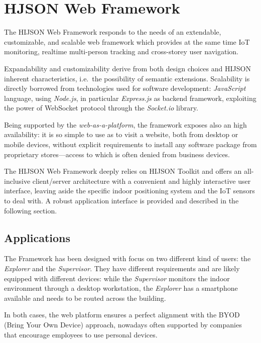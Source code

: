 \section{HJSON Web Framework}\label{hijson-web-framework}

The HIJSON Web Framework responds to the needs of an extendable,
customizable, and scalable web framework which provides at the same time IoT
monitoring, realtime multi-person tracking and cross-storey user
navigation.

Expandability and customizability derive from both design choices and
HIJSON inherent characteristics, i.e.~the possibility of semantic extensions.
Scalability is directly borrowed from technologies used for
software development: \emph{JavaScript} language, using \emph{Node.js},
in particular \emph{Express.js} as backend framework, exploiting the
power of WebSocket protocol through the \emph{Socket.io} library.

Being supported by the \emph{web-as-a-platform}, the framework exposes
also an high availability: it is so simple to use as to visit a
website, both from desktop or mobile devices, without explicit
requirements to install any software package from proprietary stores---access to
which is often denied from business devices.

The HIJSON Web Framework deeply relies on HIJSON Toolkit and offers an
all-inclusive client/server architecture with a convenient and highly interactive
user interface, leaving aside the specific indoor positioning system and
the IoT sensors to deal with. A robust application interface is provided and
described in the following section.

\subsection{Applications}\label{applications}

The Framework has been designed with focus on two different kind of
users: the \emph{Explorer} and the \emph{Supervisor}. They have
different requirements and are likely equipped with different devices:
while the \emph{Supervisor} monitors the indoor environment through a
desktop workstation, the \emph{Explorer} has a smartphone available and
needs to be routed across the building.

In both cases, the web platform ensures a perfect alignment with the
BYOD (Bring Your Own Device) approach, nowadays often supported by companies
that encourage employees to use personal devices.


